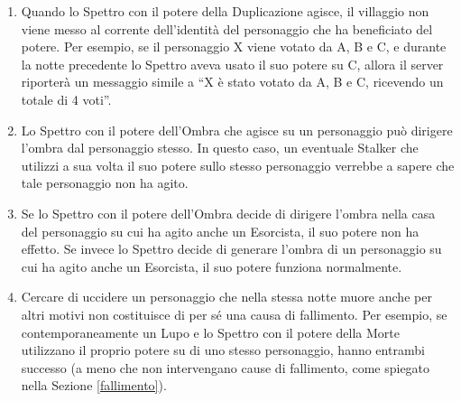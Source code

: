 \documentclass[a4paper,10pt]{article}
\begin{document}
\begin{enumerate}
 \item Quando lo Spettro con il potere della Duplicazione agisce, il villaggio
non viene messo al corrente dell'identità del personaggio che ha beneficiato del
potere. Per esempio, se il personaggio X viene votato da A, B e C, e durante la
notte precedente lo Spettro aveva usato il suo potere su C, allora il server
riporterà un messaggio simile a ``X è stato votato da A, B e C, ricevendo un
totale di 4 voti''.
 
 \item Lo Spettro con il potere dell'Ombra che agisce su un personaggio può
dirigere l'ombra dal personaggio stesso. In questo caso, un eventuale Stalker
che utilizzi a sua volta il suo potere sullo stesso personaggio verrebbe a
sapere che tale personaggio non ha agito.
 
 \item  Se lo Spettro con il potere dell'Ombra decide di dirigere l'ombra 
nella casa del personaggio su cui ha agito anche un Esorcista, il suo potere
non ha effetto.
 Se invece lo Spettro decide di generare l'ombra di un personaggio su cui ha
agito anche un Esorcista, il suo potere funziona normalmente.
 
 \item Cercare di uccidere un personaggio che nella stessa notte muore anche per
altri motivi non costituisce di per sé una causa di fallimento.
 Per esempio, se contemporaneamente un Lupo e lo Spettro con il potere della
Morte utilizzano il proprio potere su di uno stesso personaggio, hanno entrambi
successo (a meno che non intervengano cause di fallimento, come spiegato nella
Sezione \ref{fallimento}).
 
 
\end{enumerate}

\printindex
\end{document}
